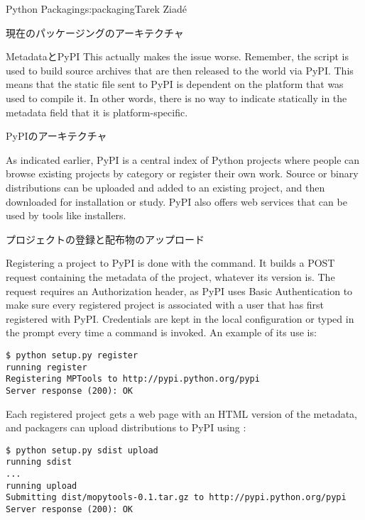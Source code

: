 \begin{aosachapter}{Python Packaging}{s:packaging}{Tarek Ziad\'{e}}
\begin{aosasect1}{現在のパッケージングのアーキテクチャ}
\begin{aosasect2}{MetadataとPyPI}
\noindent This actually makes the issue worse. Remember, the script is used to
build source archives that are then released to the world via PyPI.
This means that the static  file sent to PyPI is
dependent on the platform that was used to compile it.  In other
words, there is no way to indicate statically in the metadata field
that it is platform-specific.

\end{aosasect2}

\begin{aosasect2}{PyPIのアーキテクチャ}


As indicated earlier, PyPI is a central index of Python projects where
people can browse existing projects by category or register their own
work.  Source or binary distributions can be uploaded and added to an
existing project, and then downloaded for installation or study.  PyPI
also offers web services that can be used by tools like installers.

\begin{aosasect3}{プロジェクトの登録と配布物のアップロード}

Registering a project to PyPI is done with the 
 command.  It builds a POST request containing the
metadata of the project, whatever its version is.  The request
requires an Authorization header, as PyPI uses Basic Authentication to
make sure every registered project is associated with a user that has
first registered with PyPI\@.  Credentials are kept in the local
 configuration or typed in the prompt every time a
 command is invoked.  An example of its use is:

\begin{verbatim}
$ python setup.py register
running register
Registering MPTools to http://pypi.python.org/pypi
Server response (200): OK
\end{verbatim}

\noindent Each registered project gets a web page with an HTML version of the
metadata, and packagers can upload distributions to PyPI using
:

\begin{verbatim}
$ python setup.py sdist upload
running sdist
...
running upload
Submitting dist/mopytools-0.1.tar.gz to http://pypi.python.org/pypi
Server response (200): OK
\end{verbatim}


\end{aosasect3}
\end{aosasect2}
\end{aosasect1}
\end{aosachapter}
